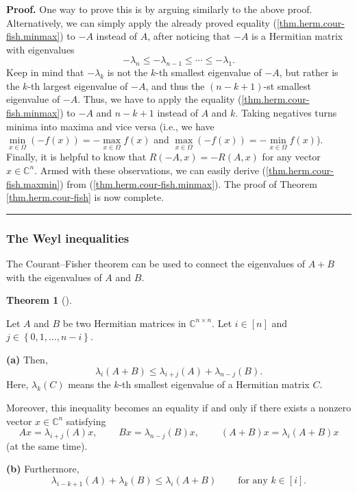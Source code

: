 \documentclass[numbers=enddot,12pt,final,onecolumn,notitlepage]{scrartcl}%
\numberwithin{exer}{subsection}
\theoremstyle{definition}
\newtheorem{theo}{Theorem}[subsection]
\newenvironment{theorem}[1][]
{\begin{theo}[#1]\begin{leftbar}}
{\end{leftbar}\end{theo}}
\newenvironment{proof}[1][Proof]{\noindent\textbf{#1.} }{\ \rule{0.5em}{0.5em}}
\begin{document}
\begin{proof}
One way to prove this is by arguing similarly to the above proof.
Alternatively, we can simply apply the already proved equality
(\ref{thm.herm.cour-fish.minmax}) to $-A$ instead of $A$, after noticing that
$-A$ is a Hermitian matrix with eigenvalues%
\[
-\lambda_{n}\leq-\lambda_{n-1}\leq\cdots\leq-\lambda_{1}.
\]
Keep in mind that $-\lambda_{k}$ is not the $k$-th smallest eigenvalue of
$-A$, but rather is the $k$-th largest eigenvalue of $-A$, and thus the
$\left(  n-k+1\right)  $-st smallest eigenvalue of $-A$. Thus, we have to
apply the equality (\ref{thm.herm.cour-fish.minmax}) to $-A$ and $n-k+1$
instead of $A$ and $k$. Taking negatives turns minima into maxima and vice
versa (i.e., we have $\min\limits_{x\in\Omega}\left(  -f\left(  x\right)
\right)  =-\max\limits_{x\in\Omega}f\left(  x\right)  $ and $\max
\limits_{x\in\Omega}\left(  -f\left(  x\right)  \right)  =-\min\limits_{x\in
\Omega}f\left(  x\right)  $). Finally, it is helpful to know that $R\left(
-A,x\right)  =-R\left(  A,x\right)  $ for any vector $x\in\mathbb{C}^{n}$.
Armed with these observations, we can easily derive
(\ref{thm.herm.cour-fish.maxmin}) from (\ref{thm.herm.cour-fish.minmax}). The
proof of Theorem \ref{thm.herm.cour-fish} is now complete.
\end{proof}

\subsubsection{The Weyl inequalities}

The Courant--Fisher theorem can be used to connect the eigenvalues of $A+B$
with the eigenvalues of $A$ and $B$.

\begin{theorem}
[Weyl's inequalities]\label{thm.herm.weyl-ineq}Let $A$ and $B$ be two
Hermitian matrices in $\mathbb{C}^{n\times n}$. Let $i\in\left[  n\right]  $
and $j\in\left\{  0,1,\ldots,n-i\right\}  $. \medskip

\textbf{(a)} Then,%
\[
\lambda_{i}\left(  A+B\right)  \leq\lambda_{i+j}\left(  A\right)
+\lambda_{n-j}\left(  B\right)  .
\]
Here, $\lambda_{k}\left(  C\right)  $ means the $k$-th smallest eigenvalue of
a Hermitian matrix $C$.

Moreover, this inequality becomes an equality if and only if there exists a
nonzero vector $x\in\mathbb{C}^{n}$ satisfying
\[
Ax=\lambda_{i+j}\left(  A\right)  x,\ \ \ \ \ \ \ \ \ \ Bx=\lambda
_{n-j}\left(  B\right)  x,\ \ \ \ \ \ \ \ \ \ \left(  A+B\right)
x=\lambda_{i}\left(  A+B\right)  x
\]
(at the same time). \medskip

\textbf{(b)} Furthermore,%
\[
\lambda_{i-k+1}\left(  A\right)  +\lambda_{k}\left(  B\right)  \leq\lambda
_{i}\left(  A+B\right)  \ \ \ \ \ \ \ \ \ \ \text{for any }k\in\left[
i\right]  .
\]

\end{theorem}
\end{document}
